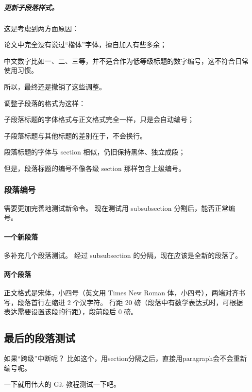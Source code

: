 \documentclass[../Main/thesis]{subfiles}
\begin{document}
\subparagraph{更新子段落样式。}
这是考虑到两方面原因：
\begin{inlinecn}
  \item 论文中完全没有说过“楷体”字体，擅自加入有些多余；
  \item 中文数字比如一、二、三等，并不适合作为低等级标题的数字编号，这不符合日常使用习惯。
\end{inlinecn}
所以，最终还是撤销了这些调整。

调整子段落的格式为这样：
\begin{inline}
  \item 子段落标题的字体格式与正文格式完全一样，只是会自动编号；
  \item 子段落标题与其他标题的差别在于，不会换行。
  \item 段落标题的字体与 section 相似，仍旧保持黑体、独立成段；
  \item 但是，段落标题的编号不像各级 section 那样包含上级编号。
\end{inline}

\subsubsection{段落编号}

需要更加完善地测试新命令。
现在测试用 subsubsection 分割后，能否正常编号。

\paragraph{一个新段落}

多补充几个段落测试。
经过 subsubsection 的分隔，现在应该是全新的段落了。

\paragraph{两个段落} \label{par:second}

正文格式是宋体，小四号（英文用 Times New Roman 体，小四号），两端对齐书写，段落首行左缩进 2 个汉字符。
行距 20 磅（段落中有数学表达式时，可根据表达需要设置该段的行距），段前段后 0 磅。

\subsection{最后的段落测试} \label{ssc:lastpar}

如果“跨级”中断呢？
比如这个，用section分隔之后，直接用paragraph会不会重新编号呢。

一下就用伟大的 Git 教程测试一下吧。
\end{document}
